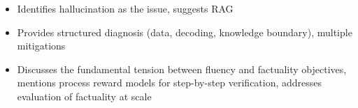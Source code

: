 \begin{interviewq}

\goodgreat
\begin{itemize}
    \item {} Identifies hallucination as the issue, suggests RAG
    \item {} Provides structured diagnosis (data, decoding, knowledge boundary), multiple mitigations
    \item {} Discusses the fundamental tension between fluency and factuality objectives, mentions process reward models for step-by-step verification, addresses evaluation of factuality at scale
\end{itemize}

\end{interviewq}

